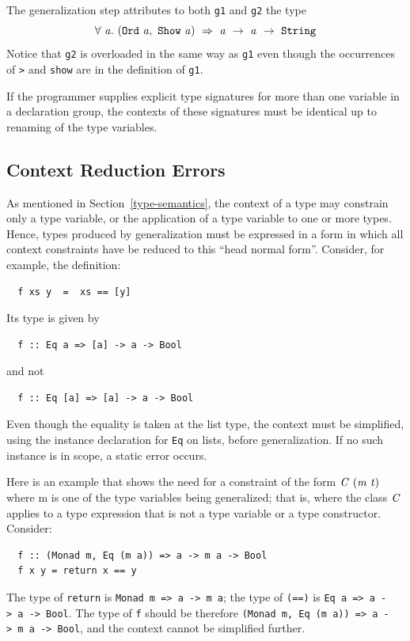 The generalization step attributes to both \mbox{\tt g1} and \mbox{\tt g2} the type
\[
\mbox{$\it \forall\ a.~(\makebox{\tt Ord}~a,~\makebox{\tt Show}~a)\ \Rightarrow\ a\ \rightarrow\ a\ \rightarrow\ \makebox{\tt String}$}
\]
Notice that \mbox{\tt g2} is overloaded in the same way as \mbox{\tt g1} even though the
occurrences of \mbox{\tt >} and \mbox{\tt show} are in the definition of \mbox{\tt g1}.

If the programmer supplies explicit type signatures for more than one variable
in a declaration group, the contexts of these signatures must be 
identical up to renaming of the type variables.

\subsection{Context Reduction Errors}
\label{context-reduction}
As mentioned in Section~\ref{type-semantics}, the context of a type
may constrain only a type variable, or the application of a type variable
to one or more types.  Hence, types produced by
generalization must be expressed in a form in which all context
constraints have be reduced to this ``head normal form''.
Consider, for example, the
definition:
\bprog
{\small\begin{verbatim}
  f xs y  =  xs == [y]
\end{verbatim}}
\eprog
Its type is given by
\bprog
{\small\begin{verbatim}
  f :: Eq a => [a] -> a -> Bool
\end{verbatim}}
\eprog
and not
\bprog
{\small\begin{verbatim}
  f :: Eq [a] => [a] -> a -> Bool
\end{verbatim}}
\eprog
Even though the equality is taken at the list type, the context must
be simplified, using the instance declaration for \mbox{\tt Eq} on lists,
before generalization.  If no such instance is in scope, a static
error occurs.

Here is an example that shows the need for a
constraint of the form \mbox{$\it C\ (m\ t)$} where m is one of the type
variables being generalized; that is, where the class \mbox{$\it C$} applies to a type
expression that is not a type variable or a type constructor.
Consider:
\bprog
{\small\begin{verbatim}
  f :: (Monad m, Eq (m a)) => a -> m a -> Bool
  f x y = return x == y
\end{verbatim}}
\eprog
The type of \mbox{\tt return} is \mbox{\tt Monad\ m\ =>\ a\ ->\ m\ a}; the type of \mbox{\tt (==)} is
\mbox{\tt Eq\ a\ =>\ a\ ->\ a\ ->\ Bool}.  The type of \mbox{\tt f} should be
therefore \mbox{\tt (Monad\ m,\ Eq\ (m\ a))\ =>\ a\ ->\ m\ a\ ->\ Bool}, and the context
cannot be simplified further.

